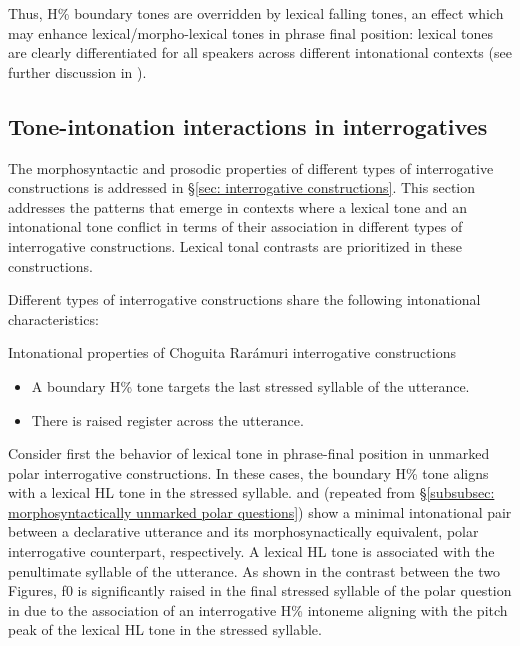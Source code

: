 Thus, H\% boundary tones are overridden by lexical falling tones, an effect which may enhance lexical/morpho-lexical tones in phrase final position: lexical tones are clearly differentiated for all speakers across different intonational contexts (see further discussion in \citealt{garellek2015lexical}).

\subsection{Tone-intonation interactions in interrogatives}
\label{subsec: tone-intonation interactions in interrogative constructions}

The morphosyntactic and prosodic properties of different types of interrogative constructions is addressed in §\ref{sec: interrogative constructions}. This section addresses the patterns that emerge in contexts where a lexical tone and an intonational tone conflict in terms of their association in different types of interrogative constructions. Lexical tonal contrasts are prioritized in these constructions.

Different types of interrogative constructions share the following intonational characteristics:

\ea\label{ex: prosodic properties of interrogatives}
{Intonational properties of Choguita Rarámuri interrogative constructions}

\begin{itemize}
    \item A boundary H\% tone targets the last stressed syllable of the utterance.\\
    \item There is raised register across the utterance.\\
\end{itemize}
\z


Consider first the behavior of lexical tone in phrase-final position in unmarked polar interrogative constructions. In these cases, the boundary H\% tone aligns with a lexical HL tone in the stressed syllable.  and  (repeated from §\ref{subsubsec: morphosyntactically unmarked polar questions}) show a minimal intonational pair between a declarative utterance and its morphosynactically equivalent, polar interrogative counterpart, respectively. A lexical HL tone is associated with the penultimate syllable of the utterance. As shown in the contrast between the two Figures, f0 is significantly raised in the final stressed syllable of the polar question in  due to the association of an interrogative H\% intoneme aligning with the pitch peak of the lexical HL tone in the stressed syllable.


